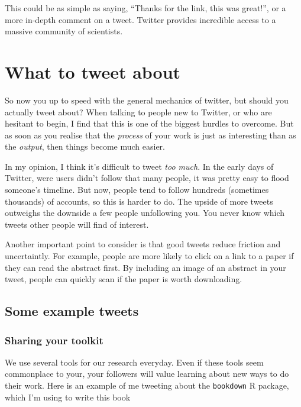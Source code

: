 \documentclass[]{book}
\begin{document}
This could be as simple as saying, ``Thanks for the link, this was great!'', or a more in-depth comment on a tweet. Twitter provides incredible access to a massive community of scientists.

\hypertarget{what-to-tweet-about}{%
\chapter{What to tweet about}\label{what-to-tweet-about}}

So now you up to speed with the general mechanics of twitter, but should you actually tweet about? When talking to people new to Twitter, or who are hesitant to begin, I find that this is one of the biggest hurdles to overcome. But as soon as you realise that the \emph{process} of your work is just as interesting than as the \emph{output}, then things become much easier.

In my opinion, I think it's difficult to tweet \emph{too much}. In the early days of Twitter, were users didn't follow that many people, it was pretty easy to flood someone's timeline. But now, people tend to follow hundreds (sometimes thousands) of accounts, so this is harder to do. The upside of more tweets outweighs the downside a few people unfollowing you. You never know which tweets other people will find of interest.

Another important point to consider is that good tweets reduce friction and uncertaintly. For example, people are more likely to click on a link to a paper if they can read the abstract first. By including an image of an abstract in your tweet, people can quickly scan if the paper is worth downloading.

\hypertarget{some-example-tweets}{%
\section{Some example tweets}\label{some-example-tweets}}

\hypertarget{sharing-your-toolkit}{%
\subsection{Sharing your toolkit}\label{sharing-your-toolkit}}

We use several tools for our research everyday. Even if these tools seem commonplace to your, your followers will value learning about new ways to do their work. Here is an example of me tweeting about the \texttt{bookdown} R package, which I'm using to write this book
\end{document}
